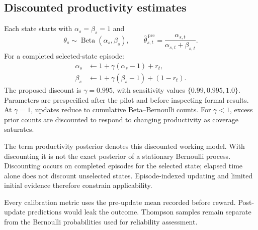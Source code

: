 \documentclass[final,5p,times,number]{elsarticle}
\begin{document}
\subsection{Discounted productivity estimates}
Each state starts with $\alpha_s=\beta_s=1$ and
\begin{equation}
\theta_s\sim\operatorname{Beta}(\alpha_s,\beta_s),\qquad
\widehat{\theta}_{s,t}^{\,\mathrm{pre}}
=\frac{\alpha_{s,t}}{\alpha_{s,t}+\beta_{s,t}}.
\end{equation}
For a completed selected-state episode:
\begin{align}
\alpha_s&\leftarrow1+\gamma(\alpha_s-1)+r_t,\\
\beta_s&\leftarrow1+\gamma(\beta_s-1)+(1-r_t).
\label{eq:update}
\end{align}
The proposed discount is $\gamma=0.995$, with sensitivity values $\{0.99,0.995,1.0\}$. Parameters are prespecified after the pilot and before inspecting formal results. At $\gamma=1$, updates reduce to cumulative Beta--Bernoulli counts. For $\gamma<1$, excess prior counts are discounted to respond to changing productivity as coverage saturates.

The term productivity posterior denotes this discounted working model. With discounting it is not the exact posterior of a stationary Bernoulli process. Discounting occurs on completed episodes for the selected state; elapsed time alone does not discount unselected states. Episode-indexed updating and limited initial evidence therefore constrain applicability.

Every calibration metric uses the pre-update mean recorded before reward. Post-update predictions would leak the outcome. Thompson samples remain separate from the Bernoulli probabilities used for reliability assessment.
\end{document}

